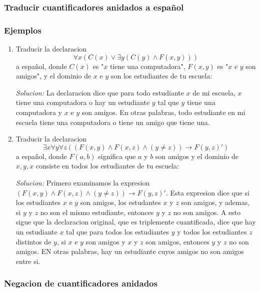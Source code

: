 \documentclass[]{article}
\begin{document}
\subsubsection*{Traducir cuantificadores anidados a español}

\subsubsection*{Ejemplos}

\begin{enumerate}
	\item Traducir la declaracion
	\begin{equation}
		\forall x(C(x) \vee \exists y(C(y) \wedge F(x,y)))
	\end{equation}
	a español, donde $C(x)$ es "$x$ tiene una computadora", $F(x,y)$ es "$x$ e $y$ son amigos", y el dominio de $x$ e $y$ son los estudiantes de tu escuela:

	\textit{Solucion:}
	La declaracion dice que para todo estudiante $x$ de mi escuela, $x$ tiene una computadora o hay un estudiante $y$ tal que $y$ tiene una computadora y $x$ e $y$ son amigos. En otras palabras, todo estudiante en mi escuela tiene una computadora o tiene un amigo que tiene una.

	\item Traducir la declaracion
	\begin{equation}
		\exists x \forall y \forall z ((F(x,y) \wedge F(x, z) \wedge (y \neq z)) \rightarrow F(y,z)')
	\end{equation}
	a español, donde $F(a,b)$ significa que $a$ y $b$ son amigos y el dominio de $x, y, x$ consiste en todos los estudiantes de tu escuela:

	\textit{Solucion:}
	Primero examinamos la expresion $(F(x,y) \wedge F(x, z) \wedge (y \neq z)) \rightarrow F(y,z)'$. Esta expresion dice que si los estudiantes $x$ e $y$ son amigos, los estudantes $x$ y $z$ son amigos, y ademas, si $y$ y $z$ no son el mismo estudiante, entonces $y$ y $z$ no son amigos. A esto sigue que la declaracion original, que es triplemente cuantificada, dice que hay un estudiante $x$ tal que para todos los estudiantes $y$ y todos los estudiantes $z$ distintos de $y$, si $x$ e $y$ son amigos y $x$ y $z$ son amigos, entonces $y$ y $z$ no son amigos. EN otras palabras, hay un estudiante cuyos amigos no son amigos entre si.
\end{enumerate}

\subsubsection*{Negacion de cuantificadores anidados}
\end{document}
